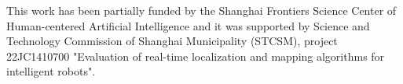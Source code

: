 \documentclass[letterpaper, 10 pt, conference]{ieeeconf}  %
\begin{document}
This work has been partially funded by the Shanghai Frontiers Science Center of Human-centered Artificial Intelligence and it was supported by Science and Technology Commission of Shanghai Municipality (STCSM), project 22JC1410700 "Evaluation of real-time localization and mapping algorithms for intelligent robots".



























\end{document}

